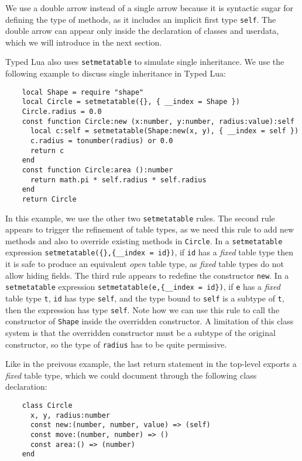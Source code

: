 We use a double arrow instead of a single arrow because it is
syntactic sugar for defining the type of methods,
as it includes an implicit first type \texttt{self}.
The double arrow can appear only inside the declaration of
classes and userdata, which we will introduce in the next section.

Typed Lua also uses \texttt{setmetatable} to simulate single inheritance.
We use the following example to discuss single inheritance in Typed Lua:
\begin{verbatim}
    local Shape = require "shape"
    local Circle = setmetatable({}, { __index = Shape })
    Circle.radius = 0.0
    const function Circle:new (x:number, y:number, radius:value):self
      local c:self = setmetatable(Shape:new(x, y), { __index = self })
      c.radius = tonumber(radius) or 0.0
      return c
    end
    const function Circle:area ():number
      return math.pi * self.radius * self.radius
    end
    return Circle
\end{verbatim}

In this example, we use the other two \texttt{setmetatable} rules.
The second rule appears to trigger the refinement of table types,
as we need this rule to add new methods and also to override
existing methods in \texttt{Circle}.
In a \texttt{setmetatable} expression
\texttt{setmetatable(\{\},\{\string_\string_index = id\})},
if \texttt{id} has a \emph{fixed} table type then it is safe to
produce an equivalent \emph{open} table type, as \emph{fixed}
table types do not allow hiding fields.
The third rule appears to redefine the constructor \texttt{new}.
In a \texttt{setmetatable} expression
\texttt{setmetatable(e,\{\string_\string_index = id\})},
if \texttt{e} has a \emph{fixed} table type \texttt{t}, \texttt{id} has
type \texttt{self}, and the type bound to \texttt{self} is a subtype of
\texttt{t}, then the expression has type \texttt{self}.
Note how we can use this rule to call the constructor of \texttt{Shape}
inside the overridden constructor.
A limitation of this class system is that the overridden constructor
must be a subtype of the original constructor,
so the type of \texttt{radius} has to be quite permissive.

Like in the preivous example, the last return statement in the
top-level exports a \emph{fixed} table type, which we could
document through the following class declaration:
\begin{verbatim}
    class Circle
      x, y, radius:number
      const new:(number, number, value) => (self)
      const move:(number, number) => ()
      const area:() => (number)
    end
\end{verbatim}

